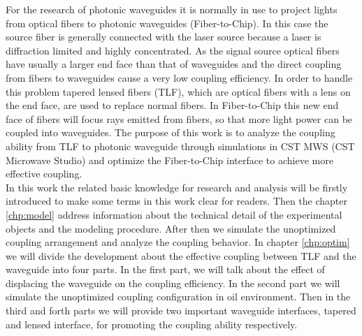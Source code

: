 For the research of photonic waveguides it is normally in use to project lights from optical fibers to photonic waveguides (Fiber-to-Chip). In this case the source fiber is generally connected with the laser source because a laser is diffraction limited and highly concentrated. As the signal source optical fibers have usually a larger end face than that of waveguides and the direct coupling from fibers to waveguides cause a very low coupling efficiency. In order to handle this problem tapered lensed fibers (TLF), which are optical fibers with a lens on the end face, are used to replace normal fibers. In Fiber-to-Chip this new end face of fibers will focus rays emitted from fibers, so that more light power can be coupled into waveguides. The purpose of this work is to analyze the coupling ability from TLF to photonic waveguide through simulations in CST MWS (CST Microwave Studio\textregistered) and optimize the Fiber-to-Chip interface to achieve more effective coupling.\\

In this work the related basic knowledge for research and analysis will be firstly introduced to make some terms in this work clear for readers. Then the chapter \ref{chp:model} address information about the technical detail of the experimental objects and the modeling procedure. After then we simulate the unoptimized coupling arrangement and analyze the coupling behavior. In chapter \ref{chp:optim} we will divide the development about the effective coupling between TLF and the waveguide into four parts. In the first part, we will talk about the effect of displacing the waveguide on the coupling efficiency. In the second part we will simulate the unoptimized coupling configuration in oil environment. Then in the third and forth parts we will provide two important waveguide interfaces, tapered and lensed interface, for promoting the coupling ability respectively.\\  
